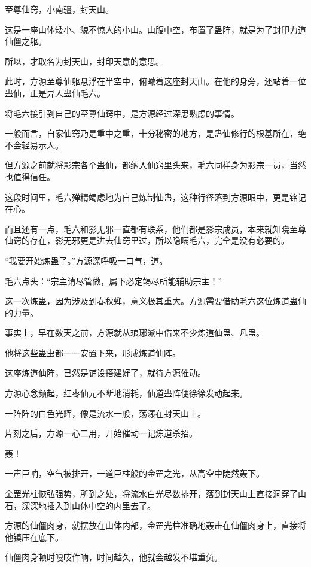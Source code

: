 
\begin{this_body}

至尊仙窍，小南疆，封天山。

这是一座山体矮小、貌不惊人的小山。山腹中空，布置了蛊阵，就是为了封印力道仙僵之躯。

所以，才取名为封天山，封印天意的意思。

此时，方源至尊仙躯悬浮在半空中，俯瞰着这座封天山。在他的身旁，还站着一位蛊仙，正是异人蛊仙毛六。

将毛六接引到自己的至尊仙窍中，是方源经过深思熟虑的事情。

一般而言，自家仙窍乃是重中之重，十分秘密的地方，是蛊仙修行的根基所在，绝不会轻易示人。

但方源之前就将影宗各个蛊仙，都纳入仙窍里头来，毛六同样身为影宗一员，当然也值得信任。

这段时间里，毛六殚精竭虑地为自己炼制仙蛊，这种行径落到方源眼中，更是铭记在心。

而且还有一点，毛六和影无邪一直都有联系，他们都是影宗成员，本来就知晓至尊仙窍的存在，影无邪更是进去仙窍里过，所以隐瞒毛六，完全是没有必要的。

“我要开始炼蛊了。”方源深呼吸一口气，道。

毛六点头：“宗主请尽管做，属下必定竭尽所能辅助宗主！”

这一次炼蛊，因为涉及到春秋蝉，意义极其重大。方源需要借助毛六这位炼道蛊仙的力量。

事实上，早在数天之前，方源就从琅琊派中借来不少炼道仙蛊、凡蛊。

他将这些蛊虫都一一安置下来，形成炼道仙阵。

这座炼道仙阵，已然是铺设搭建好了，就待方源催动。

方源心念频起，红枣仙元不断地消耗，仙道蛊阵便徐徐发动起来。

一阵阵的白色光辉，像是流水一般，荡漾在封天山上。

片刻之后，方源一心二用，开始催动一记炼道杀招。

轰！

一声巨响，空气被排开，一道巨柱般的金罡之光，从高空中陡然轰下。

金罡光柱恢弘强势，所到之处，将流水白光尽数排开，落到封天山上直接洞穿了山石，深深地插入到山体中空的内里去了。

方源的仙僵肉身，就摆放在山体内部，金罡光柱准确地轰击在仙僵肉身上，直接将他镇压在底下。

仙僵肉身顿时嘎吱作响，时间越久，他就会越发不堪重负。


\end{this_body}
